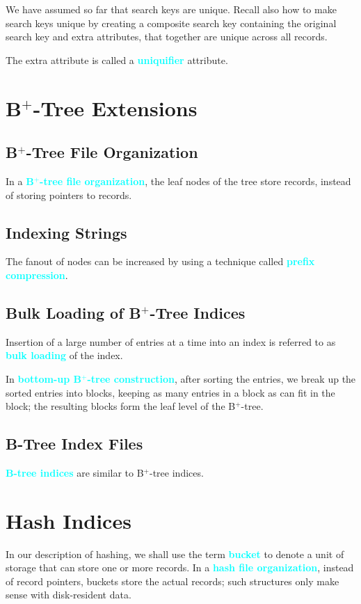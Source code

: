 \documentclass[a4paper,12pt,twoside,openany]{book}
\newcommand{\textcy}[1]{\textbf{\textcolor{cyan}{#1}}}
\begin{document}
We have assumed so far that search keys are unique. Recall also how to make search keys unique by creating a composite search key containing the original search key and extra attributes, that together are unique across all records.

The extra attribute is called a \textcy{uniquifier} attribute.

\section{B$^+$-Tree Extensions}
\subsection{B$^+$-Tree File Organization}

In a \textcy{B$^+$-tree file organization}, the leaf nodes of the tree store records, instead of storing pointers to records.

\subsection{Indexing Strings}

The fanout of nodes can be increased by using a technique called \textcy{prefix compression}.

\subsection{Bulk Loading of B$^+$-Tree Indices}

Insertion of a large number of entries at a time into an index is referred to as \textcy{bulk loading} of the index.

In \textcy{bottom-up B$^+$-tree construction}, after sorting the entries, we break up the sorted entries into blocks, keeping as many entries in a block as can fit in the block; the resulting blocks form the leaf level of the B$^+$-tree.

\subsection{B-Tree Index Files}

\textcy{B-tree indices} are similar to B$^+$-tree indices.

\section{Hash Indices}

In our description of hashing, we shall use the term \textcy{bucket} to denote a unit of storage that can store one or more records. In a \textcy{hash file organization}, instead of record pointers, buckets store the actual records; such structures only make sense with disk-resident data.
\end{document}
